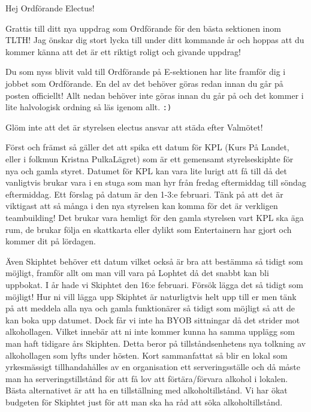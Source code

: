 \documentclass[10pt]{article}
\begin{document}
    \heading{\doctitle}
    
    Hej Ordförande Electus!
    
    Grattis till ditt nya uppdrag som Ordförande för den bästa sektionen inom TLTH! Jag önskar dig stort lycka till under ditt kommande år och hoppas att du kommer känna att det är ett riktigt roligt och givande uppdrag!
    
    Du som nyss blivit vald till Ordförande på E-sektionen har lite framför dig i jobbet som Ordförande. En del av det behöver göras redan innan du går på posten officiellt! Allt nedan behöver inte göras innan du går på och det kommer i lite halvologisk ordning så läs igenom allt. \texttt{:)}
    
    \begin{numplist}
    \item Glöm inte att det är styrelsen electus ansvar att städa efter Valmötet!
    
    \item Först och främst så gäller det att spika ett datum för KPL (Kurs På Landet, eller i folkmun Kristna PulkaLägret) som är ett gemensamt styrelseskiphte för nya och gamla styret. Datumet för KPL kan vara lite lurigt att få till då det vanligtvis brukar vara i en stuga som man hyr från fredag eftermiddag till söndag eftermiddag. Ett förslag på datum är den 1-3:e februari. Tänk på att det är viktigast att så många i den nya styrelsen kan komma för det är verkligen teambuilding! Det brukar vara hemligt för den gamla styrelsen vart KPL ska äga rum, de brukar följa en skattkarta eller dylikt som Entertainern har gjort och kommer dit på lördagen.
    
    \item Även Skiphtet behöver ett datum vilket också är bra att bestämma så tidigt som möjligt, framför allt om man vill vara på Lophtet då det snabbt kan bli uppbokat. I år hade vi Skiphtet den 16:e februari. Försök lägga det så tidigt som möjligt! Hur ni vill lägga upp Skiphtet är naturligtvis helt upp till er men tänk på att meddela alla nya och gamla funktionärer så tidigt som möjligt så att de kan boka upp datumet. Dock får vi inte ha BYOB sittningar då det strider mot alkohollagen. Vilket innebär att ni inte kommer kunna ha samma upplägg som man haft tidigare års Skiphten. Detta beror på tillståndsenhetens nya tolkning av alkohollagen som lyfts under hösten. Kort sammanfattat så blir en lokal som yrkesmässigt tillhandahålles av en organisation ett serveringsställe och då måste man ha serveringstillstånd för att få lov att förtära/förvara alkohol i lokalen. Bästa alternativet är att ha en tillställning med alkoholtillstånd. Vi har ökat budgeten för Skiphtet just för att man ska ha råd att söka alkoholtillstånd.
    

\end{numplist}
\end{document}
